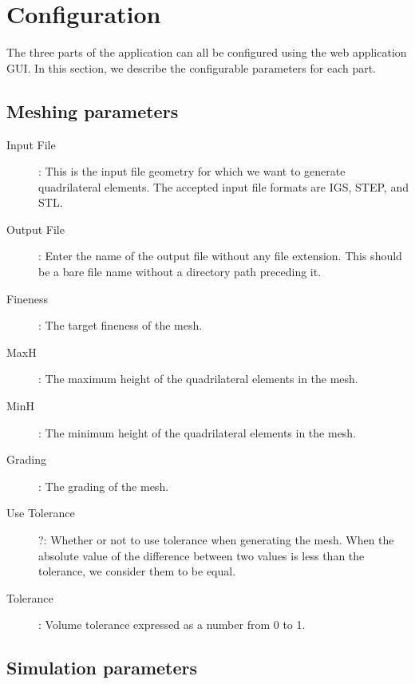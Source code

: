 \documentclass[12pt]{article}
\begin{document}
\section{Configuration}
The three parts of the application can all be configured using the web application GUI. In this section, we describe the configurable parameters for each part.

\subsection{Meshing parameters}

\begin{description}
	\item [Input File]: This is the input file geometry for which we want to generate quadrilateral elements. The accepted input file formats are IGS, STEP, and STL.
\item [Output File]: Enter the name of the output file without any file extension. This should be a bare file name without a directory path preceding it.
\item [Fineness]: The target fineness of the mesh.
\item [MaxH]: The maximum height of the quadrilateral elements in the mesh. 
\item [MinH]: The minimum height of the quadrilateral elements in the mesh. 
\item [Grading]: The grading of the mesh.
\item [Use Tolerance]?: Whether or not to use tolerance when generating the mesh. When the absolute value of the difference between two values is less than the tolerance, we consider them to be equal.
\item [Tolerance]: Volume tolerance expressed as a number from 0 to 1.
\end{description}


\subsection{Simulation parameters}
\end{document}

